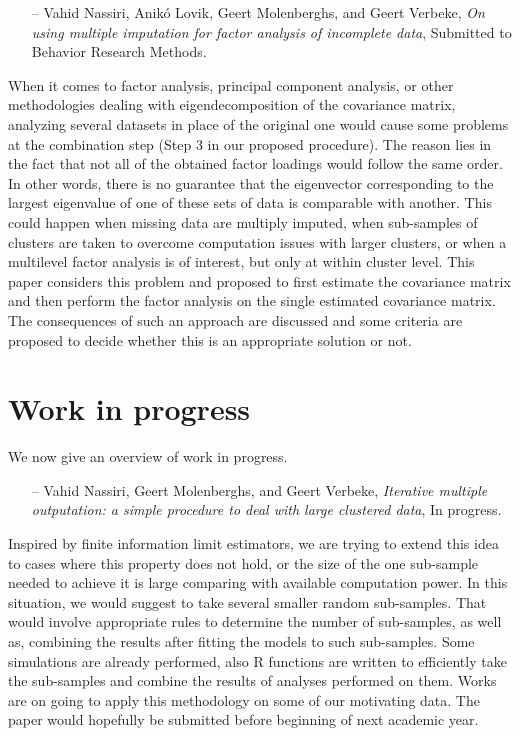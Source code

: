 \documentclass[14pt]{article}
\begin{document}
\begin{itemize}
\item[--]{\textsf{Vahid Nassiri, Anik\'{o} Lovik, Geert Molenberghs, and Geert Verbeke}}, {\it On using multiple imputation for factor analysis of incomplete data}, Submitted to Behavior Research Methods.
\end{itemize}
When it comes to factor analysis, principal component analysis, or other methodologies dealing with  eigendecomposition of the covariance matrix, analyzing several datasets in place of the original one would cause some problems at the combination step (Step 3 in our proposed procedure). The reason lies in the fact that not all of the obtained factor loadings would follow the same order. In other words, there is no guarantee that the eigenvector corresponding to the largest eigenvalue of one of these sets of data is comparable with another. This could happen when missing data are multiply imputed, when sub-samples of clusters are taken to overcome computation issues with larger clusters, or when a multilevel factor analysis is of interest, but only at within cluster level. This paper considers this problem and proposed to first estimate the covariance matrix and then perform the factor analysis on the single estimated covariance matrix. The consequences of such an approach are discussed and some criteria are proposed to decide whether this is an appropriate solution or not.



\section{Work in progress}
\label{sec_progress}

We now give an overview of work in progress.

\begin{itemize}
\item[--]{\textsf{Vahid Nassiri, Geert Molenberghs, and Geert Verbeke}}, {\it Iterative multiple outputation: a simple procedure to deal with large clustered data}, In progress.
\end{itemize}
Inspired by finite information limit estimators, we are trying to extend this idea to cases where this property does not hold, or the size of the one sub-sample needed to achieve it is large comparing with available computation power. In this situation, we would suggest to take several smaller random sub-samples. That would involve appropriate rules to determine the number of sub-samples, as well as, combining the results after fitting the models to such sub-samples. Some simulations are already performed, also \textsf{R} functions are written to efficiently take the sub-samples and combine the results of analyses performed on them. Works are on going to apply this methodology on some of our motivating data. The paper would hopefully be submitted before beginning of next academic year.
\end{document}
